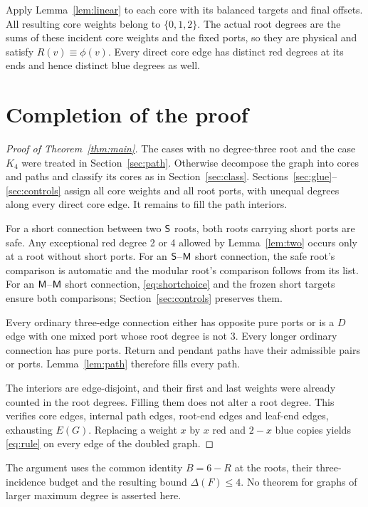 Apply Lemma~\ref{lem:linear} to each core with its balanced targets
and final offsets.  All resulting core weights belong to $\{0,1,2\}$.
The actual root degrees are the sums of these incident core weights
and the fixed ports, so they are physical and satisfy
$R(v)\equiv\phi(v)$.  Every direct core edge has distinct red
degrees at its ends and hence distinct blue degrees as well.

\section{Completion of the proof}\label{sec:complete}

\begin{proof}[Proof of Theorem~\ref{thm:main}]
The cases with no degree-three root and the case $K_4$ were treated
in Section~\ref{sec:path}.  Otherwise decompose the graph into cores
and paths and classify its cores as in Section~\ref{sec:class}.
Sections~\ref{sec:glue}--\ref{sec:controls} assign all core weights
and all root ports, with unequal degrees along every direct core
edge.  It remains to fill the path interiors.

For a short connection between two $\mathsf S$ roots, both roots carrying
short ports are safe.  Any exceptional red degree 2 or 4 allowed by
Lemma~\ref{lem:two} occurs only at a root without short ports.
For an $\mathsf S$--$\mathsf M$ short connection, the safe root's comparison
is automatic and the modular root's comparison follows from its list.
For an $\mathsf M$--$\mathsf M$ short connection, \eqref{eq:shortchoice} and
the frozen short targets ensure both comparisons; Section~\ref{sec:controls}
preserves them.

Every ordinary three-edge connection either has opposite pure ports
or is a $D$ edge with one mixed port whose root degree is not 3.
Every longer ordinary connection has pure ports.  Return and pendant
paths have their admissible pairs or ports.  Lemma~\ref{lem:path}
therefore fills every path.

The interiors are edge-disjoint, and their first and last weights
were already counted in the root degrees.  Filling them does not
alter a root degree.  This verifies core edges, internal path edges,
root-end edges and leaf-end edges, exhausting $E(G)$.  Replacing a
weight $x$ by $x$ red and $2-x$ blue copies yields \eqref{eq:rule}
on every edge of the doubled graph.
\end{proof}

The argument uses the common identity $B=6-R$ at the roots, their
three-incidence budget and the resulting bound $\Delta(F)\le4$.
No theorem for graphs of larger maximum degree is asserted here.

